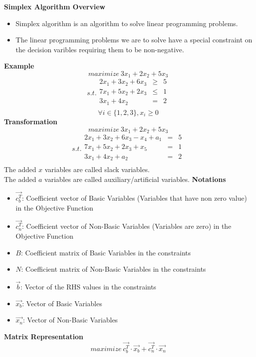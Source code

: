 \documentclass[landscape,letterpaper,pdftex]{slides}
\begin{document}
	\large{\textbf{Simplex Algorithm Overview}}
	\begin{itemize}
		\item
		Simplex algorithm is an algorithm to solve linear programming problems.
		\item
		The linear programming problems we are to solve have a special constraint on the decision varibles requiring them to be non-negative.
	\end{itemize}
	\newpage
	\large{\textbf{Example}}
	\[maximize\ 3x_1 + 2x_2 + 5x_3\]
	\[s.t.\begin{array}{lcl}
		2x_1 + 3x_2 + 6x_3 &\geqslant &5\\
		7x_1 + 5x_2 + 2x_3 &\leqslant &1\\
		3x_1 + 4x_2        &=         &2\\
	\end{array}\]
	\[\forall i \in \{1, 2, 3\}, x_i \geqslant 0\]
	\newpage
	\large{\textbf{Transformation}}
	\[maximize\ 3x_1 + 2x_2 + 5x_3\]
	\[s.t.\begin{array}{lcl}
	2x_1 + 3x_2 + 6x_3 - x_4 + a_1 &= &5\\
	7x_1 + 5x_2 + 2x_3 + x_5       &= &1\\
	3x_1 + 4x_2 + a_2              &= &2\\
	\end{array}\]
	The added $x$ variables are called slack variables.\\
	The added $a$ variables are called auxiliary/artificial variables.
	\newpage
	\large{\textbf{Notations}}
	\begin{itemize}
		\item
		$\vec{c_{b}^{T}}$: Coefficient vector of Basic Variables (Variables that have non zero value) in the Objective Function
		\item
		$\vec{c_{n}^{T}}$: Coefficient vector of Non-Basic Variables (Variables are zero) in the Objective Function
		\item
		$B$: Coefficient matrix of Basic Variables in the constraints 
		\item
		$N$: Coefficient matrix of Non-Basic Variables in the constraints
		\item
		$\vec{b}$: Vector of the RHS values in the constraints
		\item
		$\vec{x_b}$: Vector of Basic Variables
		\item
		$\vec{x_n}$: Vector of Non-Basic Variables
	\end{itemize}
	\newpage
	\large{\textbf{Matrix Representation}}
	\[maximize\ \vec{c_{b}^{T}}\cdot \vec{x_b} + \vec{c_{n}^{T}}\cdot \vec{x_n}\]
\end{document}
